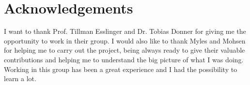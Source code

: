 \chapter*{Acknowledgements}
I want to thank Prof. Tillman Esslinger and Dr. Tobias Donner for giving me the opportunity to work in their group. I would also like to thank Myles and Mohsen for helping me to carry out the project, being always ready to give their valuable contributions and helping me to understand the big picture of what I was doing. Working in this group has been a great experience and I had the possibility to learn a lot.